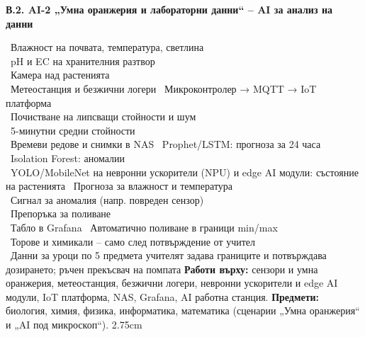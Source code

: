 \documentclass[11pt,a4paper]{article}
\begin{document}
\bigskip
\noindent\begin{minipage}{\textwidth}
\textbf{\color{navy}В.2. AI-2 „Умна оранжерия и лабораторни данни“ – AI за анализ на данни}\par\smallskip
\AppVPipeline
{\textbullet~Влажност на почвата, температура, светлина\\
 \textbullet~pH и EC на хранителния разтвор\\
 \textbullet~Камера над растенията\\
 \textbullet~Метеостанция и безжични логери}
{\textbullet~Микроконтролер → MQTT → IoT платформа\\
 \textbullet~Почистване на липсващи стойности и шум\\
 \textbullet~5-минутни средни стойности\\
 \textbullet~Времеви редове и снимки в NAS}
{\textbullet~Prophet/LSTM: прогноза за 24 часа\\
 \textbullet~Isolation Forest: аномалии\\
 \textbullet~YOLO/MobileNet на невронни ускорители (NPU) и edge AI модули: състояние на растенията}
{\textbullet~Прогноза за влажност и температура\\
 \textbullet~Сигнал за аномалия (напр. повреден сензор)\\
 \textbullet~Препоръка за поливане\\
 \textbullet~Табло в Grafana}
{\textbullet~Автоматично поливане в граници min/max\\
 \textbullet~Торове и химикали – само след потвърждение от учител\\
 \textbullet~Данни за уроци по 5 предмета}
{учителят задава границите и потвърждава дозирането; ръчен прекъсвач на помпата}
{\textbf{Работи върху:} сензори и умна оранжерия, метеостанция, безжични логери, невронни ускорители и edge AI модули, IoT платформа, NAS, Grafana, AI работна станция. \textbf{Предмети:} биология, химия, физика, информатика, математика (сценарии „Умна оранжерия“ и „AI под микроскоп“).}
{2.75cm}
\end{minipage}
\end{document}
